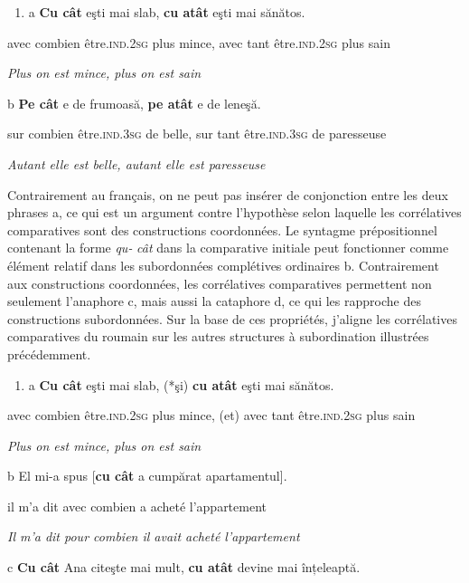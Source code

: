 \begin{enumerate}
\item a  \textbf{Cu  cât}  eşti  mai  slab,  \textbf{cu  atât}  eşti  mai  sănătos.


\end{enumerate}
avec  combien  être.\textsc{ind.2sg}  plus  mince,  avec  tant  être.\textsc{ind.2sg}  plus  sain 

{\itshape
Plus on est mince, plus on est sain}

  b  \textbf{Pe  cât}  e  de  frumoasă,  \textbf{pe  atât}  e  de  leneşă.

    sur  combien  être.\textsc{ind.3sg}  de  belle,  sur  tant  être.\textsc{ind.3sg}  de  paresseuse

    \textit{Autant elle est belle, autant elle est paresseuse}

Contrairement au français, on ne peut pas insérer de conjonction entre les deux phrases a, ce qui est un argument contre l'hypothèse selon laquelle les corrélatives comparatives sont des constructions coordonnées. Le syntagme prépositionnel contenant la forme \textit{qu-} \textit{cât} dans la comparative initiale peut fonctionner comme élément relatif dans les subordonnées complétives ordinaires b. Contrairement aux constructions coordonnées, les corrélatives comparatives permettent non seulement l'anaphore c, mais aussi la cataphore d, ce qui les rapproche des constructions subordonnées. Sur la base de ces propriétés, j'aligne les corrélatives comparatives du roumain sur les autres structures à subordination illustrées précédemment. 


\begin{enumerate}
\item \label{bkm:Ref301522035}a  \textbf{Cu  cât}  eşti  mai  slab,  (*şi)  \textbf{cu  atât}  eşti  mai  sănătos.


\end{enumerate}
avec  combien  être.\textsc{ind.2sg}  plus  mince,  (et)  avec  tant  être.\textsc{ind.2sg}  plus  sain 

{\itshape
Plus on est mince, plus on est sain}

  b  El  mi-a  spus  [\textbf{cu  cât}   a  cumpărat  apartamentul].

    il  m'a  dit  avec  combien  a  acheté  l'appartement

    \textit{Il m'a dit pour combien il avait acheté l'appartement}

  c  \textbf{Cu cât}  Ana  citeşte  mai mult,  \textbf{cu atât}  devine  mai  înțeleaptă.

